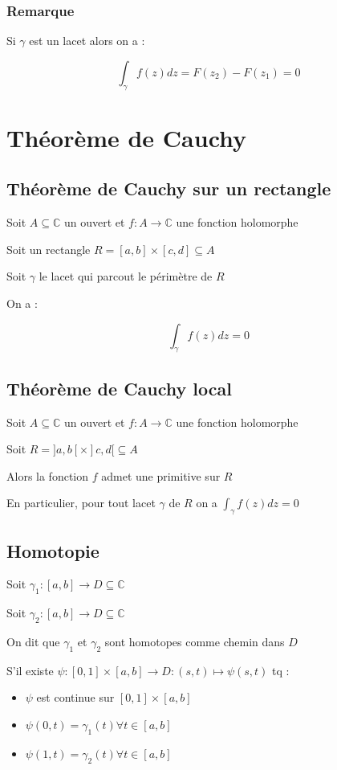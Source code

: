 \documentclass[a4paper,10pt]{report}
\newcommand{\ap}{\rightarrow}
\newcommand{\C}{\mathbb{C}}
\begin{document}
\subsubsection{Remarque}

Si $\gamma$ est un lacet alors on a :

\[ \int_\gamma f(z) dz = F(z_2) - F(z_1) = 0 \]

\section{Théorème de Cauchy}

\subsection{Théorème de Cauchy sur un rectangle}

Soit $A \subseteq \C$ un ouvert et $f : A \ap \C$ une fonction holomorphe

Soit un rectangle $R = [a,b] \times [c,d] \subseteq A$

Soit $\gamma$ le lacet qui parcout le périmètre de $R$

On a :

\[ \int_\gamma f(z) dz = 0 \]

\subsection{Théorème de Cauchy local}

Soit $A \subseteq \C$ un ouvert et $f : A \ap \C$ une fonction holomorphe

Soit $R = ]a,b[ \times ]c,d[ \subseteq A$

Alors la fonction $f$ admet une primitive sur $R$

En particulier, pour tout lacet $\gamma$ de $R$ on a $\int_\gamma f(z) dz = 0$

\subsection{Homotopie}

Soit $\gamma_1 : [a,b] \ap D \subseteq \C$

Soit $\gamma_2 : [a,b] \ap D \subseteq \C$

On dit que $\gamma_1$ et $\gamma_2$ sont homotopes comme chemin dans $D$

S'il existe $\psi : [0,1] \times [a,b] \ap D : (s,t) \mapsto \psi(s,t)$ tq :

\begin{itemize}
\item{$\psi$ est continue sur $[0,1] \times [a,b]$}
\item{$\psi(0,t) = \gamma_1(t) \forall t \in [a,b]$}
\item{$\psi(1,t) = \gamma_2(t) \forall t \in [a,b]$}
\end{itemize}
\end{document}
